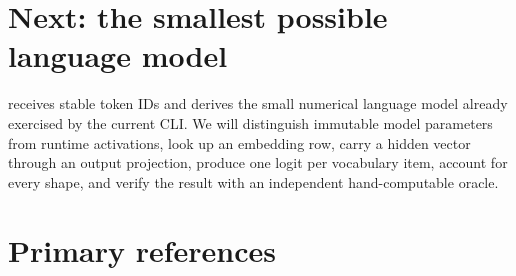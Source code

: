 \section{Next: the smallest possible language
model}\label{next-the-smallest-possible-language-model}

 receives stable token IDs and derives the small numerical language
model already exercised by the current CLI. We will distinguish immutable
model parameters from runtime
activations, look up an embedding row, carry a hidden vector through an
output projection, produce one logit per vocabulary item, account for
every shape, and verify the result with an independent hand-computable
oracle.

\section{Primary references}\label{primary-references-1}

